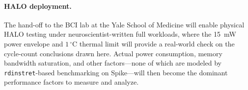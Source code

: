 \paragraph{HALO deployment.}
The hand-off to the BCI lab at the Yale School of Medicine will enable physical HALO testing under neuroscientist-written full workloads, where the 15~mW power envelope and $1\,^{\circ}$C thermal limit will provide a real-world check on the cycle-count conclusions drawn here. Actual power consumption, memory bandwidth saturation, and other factors---none of which are modeled by \texttt{rdinstret}-based benchmarking on Spike---will then become the dominant performance factors to measure and analyze.

